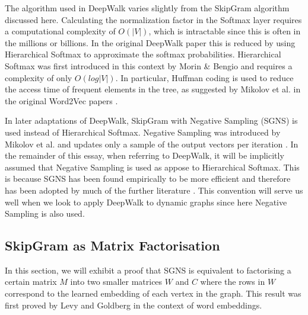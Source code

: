 \documentclass[a4paper]{article}
\begin{document}
The algorithm used in DeepWalk varies slightly from the SkipGram algorithm
discussed here. Calculating the normalization factor in the Softmax layer requires a
computational complexity of $O(|V|)$, which is intractable since this is often
in the millions or billions. In the original DeepWalk paper this is
reduced by using Hierarchical Softmax to approximate the softmax probabilities. Hierarchical Softmax was first introduced in this context by Morin \& Bengio \cite{morin2005} and 
requires a complexity of only $O(log|V|)$. In particular, Huffman coding \cite{huffman1952} is
used to reduce the access time of frequent elements in the tree, as suggested by
Mikolov et al. in the original Word2Vec
papers \cite{mikolov2013efficient,mikolov2013distributed}.

In later adaptations of DeepWalk, SkipGram with Negative Sampling (SGNS) is used instead of
Hierarchical Softmax. Negative Sampling was introduced by Mikolov et al. and updates only a sample of the output
vectors per iteration \cite{mikolov2013distributed}. In the remainder of this essay, when referring to DeepWalk, it will be
implicitly assumed that Negative Sampling is used as appose to Hierarchical
Softmax. This is because SGNS has been found empirically to be more efficient
and therefore has been adopted by much of the further literature \cite{mikolov2013distributed}. This convention will
serve us well when we look to apply DeepWalk to dynamic graphs since here Negative Sampling is also used.\\
\subsection{SkipGram as Matrix Factorisation}
In this section, we will exhibit a proof that SGNS is
equivalent to factorising a certain matrix $M$ into two smaller matrices $W$
and $C$ where the rows in $W$ correspond to the learned embedding of each vertex
in the graph. This result was first proved by Levy and
Goldberg \cite{levy&goldberg} in the context of word embeddings.\\
\end{document}
